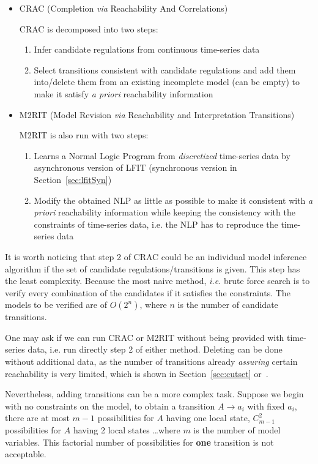 \begin{itemize}
    \item CRAC (Completion \textit{via} Reachability And Correlations)
    
    CRAC is decomposed into two steps:
    \begin{enumerate}
        \item Infer candidate regulations from continuous time-series data
        \item Select transitions consistent with candidate regulations and add them into/delete them from an existing incomplete model (can be empty) to make it satisfy \textit{a priori} reachability information
    \end{enumerate}
    \item M2RIT (Model Revision \textit{via} Reachability and Interpretation Transitions)
    
    M2RIT is also run with two steps:
    \begin{enumerate}
        \item Learns a Normal Logic Program from \textit{discretized} time-series data by asynchronous version of LFIT (synchronous version in Section~\ref{sec:lfitSyn})
        \item Modify the obtained NLP as little as possible to make it consistent with \textit{a priori} reachability information while keeping the consistency with the constraints of time-series data, i.e. the NLP has to reproduce the time-series data
    \end{enumerate}
\end{itemize}

It is worth noticing that step 2 of CRAC could be an individual model inference algorithm if the set of candidate regulations/transitions is given.
This step has the least complexity.
Because the most naive method, \textit{i.e.} brute force search is to verify every combination of the candidates if it satisfies the constraints. 
The models to be verified are of $O(2^n)$, where $n$ is the number of candidate transitions.

One may ask if we can run CRAC or M2RIT without being provided with time-series data, i.e. run directly step 2 of either method.
Deleting can be done without additional data, as the number of transitions already \textit{assuring} certain reachability is very limited, which is shown in Section~\ref{sec:cutset} or~\cite{PAK13-CAV}.

Nevertheless, adding transitions can be a more complex task.
Suppose we begin with no constraints on the model, to obtain a transition $A\to a_i$ with fixed $a_i$, there are at most $m-1$ possibilities for $A$ having one local state, $C_{m-1}^2$ possibilities for $A$ having 2 local states \ldots where $m$ is the number of model variables.
This factorial number of possibilities for \textbf{one} transition is not acceptable.

